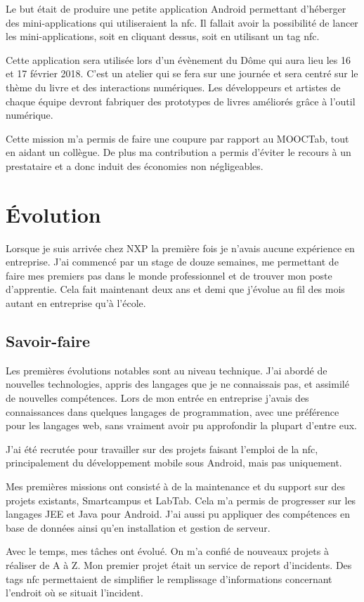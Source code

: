 \documentclass[french,12pt,a4paper,titlepage,openright,openbib]{report}
\begin{document}
Le but était de produire une petite application Android permettant d'héberger des mini-applications qui utiliseraient la \gls{nfc}. Il fallait avoir la possibilité de lancer les mini-applications, soit en cliquant dessus, soit en utilisant un tag \gls{nfc}.

Cette application sera utilisée lors d'un évènement du Dôme \cite{website:ledome} qui aura lieu les 16 et 17 février 2018. C'est un atelier qui se fera sur une journée et sera centré sur le thème du livre et des interactions numériques. Les développeurs et artistes de chaque équipe devront fabriquer des prototypes de livres améliorés grâce à l'outil numérique.

Cette mission m'a permis de faire une coupure par rapport au MOOCTab, tout en aidant un collègue. De plus ma contribution a permis d'éviter le recours à un prestataire et a donc induit des économies non négligeables.
\chapter{Évolution}
Lorsque je suis arrivée chez NXP la première fois je n'avais aucune expérience en entreprise. J'ai commencé par un stage de douze semaines, me permettant de faire mes premiers pas dans le monde professionnel et de trouver mon poste d'apprentie.
Cela fait maintenant deux ans et demi que j'évolue au fil des mois autant en entreprise qu'à l'école.
\section{Savoir-faire}
Les premières évolutions notables sont au niveau technique. J'ai abordé de nouvelles technologies, appris des langages que je ne connaissais pas, et assimilé de nouvelles compétences.
Lors de mon entrée en entreprise j'avais des connaissances dans quelques langages de programmation, avec une préférence pour les langages web, sans vraiment avoir pu approfondir la plupart d'entre eux.

J'ai été recrutée pour travailler sur des projets faisant l'emploi de la \gls{nfc}, principalement du développement mobile sous Android, mais pas uniquement.

Mes premières missions ont consisté à de la maintenance et du support sur des projets existants, Smartcampus et LabTab. Cela m'a permis de progresser sur les langages JEE et Java pour Android. J'ai aussi pu appliquer des compétences en base de données ainsi qu'en installation et gestion de serveur.

Avec le temps, mes tâches ont évolué. On m'a confié de nouveaux projets à réaliser de A à Z.
Mon premier projet était un service de report d'incidents. Des tags \gls{nfc} permettaient de simplifier le remplissage d'informations concernant l'endroit où se situait l'incident.
\end{document}
